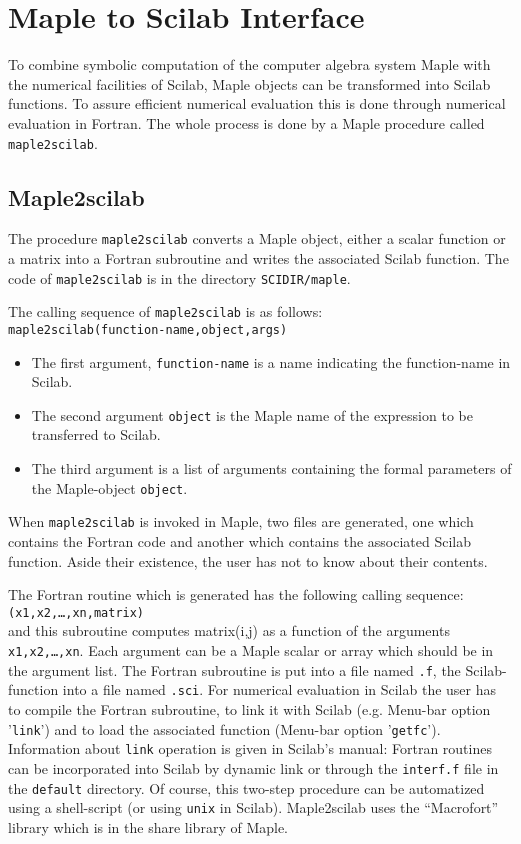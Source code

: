 
%
\chapter{Maple to Scilab Interface}
To combine symbolic computation of the computer algebra system Maple with the 
numerical facilities
of Scilab, Maple objects can be transformed into Scilab functions. To assure 
efficient numerical evaluation this is done through numerical evaluation in 
Fortran. The whole process is done by a Maple procedure called 
\verb/maple2scilab/.
\section{Maple2scilab}
The procedure \verb!maple2scilab! converts a Maple object, 
either a scalar function or a matrix into a Fortran subroutine 
and writes the associated Scilab function. The code of \verb!maple2scilab!
is in the directory \verb!SCIDIR/maple!.

The calling sequence of \verb!maple2scilab! is as follows:\\
\verb!maple2scilab(function-name,object,args)!
\begin{itemize}
\item
The first argument, \verb!function-name! is a name indicating the 
function-name in Scilab.
\item
The second argument \verb!object! is the Maple name of the expression 
to be transferred to Scilab.
\item
The third argument is a list of arguments containing the formal parameters of
the Maple-object \verb!object!.
\end{itemize}
When \verb!maple2scilab! is invoked in Maple, two files are generated,
one which contains the Fortran code and another which contains the 
associated Scilab function. Aside their existence, the user has not to
know about their contents.

The Fortran routine which is generated has the following calling sequence:\\
{\tt <Scilab-name>(x1,x2,\ldots,xn,matrix)} \\
and this subroutine computes matrix(i,j) as a function of
the arguments {\tt x1,x2,\ldots,xn}.
Each argument can be a Maple scalar or array which should be
in the argument list. 
The Fortran subroutine is put into a file named {\tt <Scilab-name>.f}, the
Scilab-function into a file named {\tt <Scilab-name>.sci}.
For numerical evaluation in Scilab the user has to compile the Fortran 
subroutine, to link it with Scilab (e.g. Menu-bar option '\verb!link!')
and to load the associated function (Menu-bar option '\verb!getfc!').
Information about \verb!link! operation is given in Scilab's manual: 
Fortran routines can be incorporated into Scilab by dynamic
link or through the \verb!interf.f! file in the \verb!default! directory.
 Of course, this two-step procedure can be automatized using a shell-script 
(or using \verb!unix! in Scilab).
Maple2scilab uses the ``Macrofort'' library which is in the share 
library of Maple.
